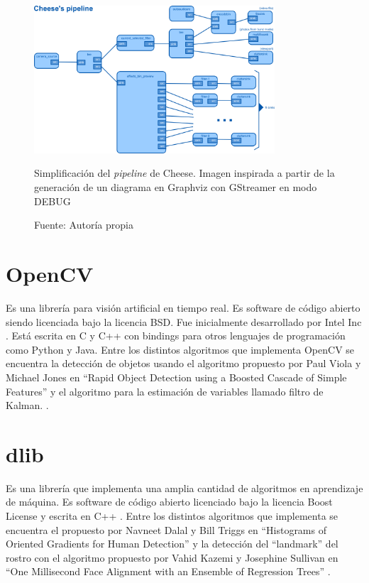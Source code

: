\documentclass[a4paper,openright,12pt]{report}
\begin{document}
\begin{figure}
  \centering
    \includegraphics[angle=90,width=0.8\textwidth]{../images/cheese-pipeline.png}\par
  \caption{Simplificación del \textit{pipeline} de Cheese. Imagen inspirada a
  				 partir de la generación de un diagrama en Graphviz con GStreamer en
  				 modo DEBUG}
  \caption*{Fuente: Autoría propia}
\end{figure}

\section{OpenCV}
Es una librería para visión artificial en tiempo real. Es software de código
abierto siendo licenciada bajo la licencia BSD. Fue inicialmente desarrollado
por Intel Inc \cite{openCVAbout}. Está escrita en C y C++ con bindings para
otros lenguajes de programación como Python y Java. Entre los distintos
algoritmos que implementa OpenCV se encuentra la detección de objetos usando
el algoritmo propuesto por Paul Viola y Michael Jones en “Rapid Object Detection
using a Boosted Cascade of Simple Features” y el algoritmo para la estimación de
 variables llamado filtro de Kalman. \cite{openCVAbout}.
\section{dlib}
Es una librería que implementa una amplia cantidad de algoritmos en aprendizaje
de máquina. Es software de código abierto licenciado bajo la
licencia Boost License y escrita en C++ \cite{dlib}\cite{dlibLicense}. Entre
los distintos algoritmos que implementa se encuentra el propuesto por Navneet
Dalal y Bill Triggs en “Histograms of Oriented Gradients for Human Detection”
\cite{dlibHOG} y la detección del “landmark” del rostro con el algoritmo
propuesto por Vahid Kazemi y Josephine Sullivan en ``One Millisecond
Face Alignment with an Ensemble of Regression Trees'' \cite{dlib1ms}.
\end{document}
